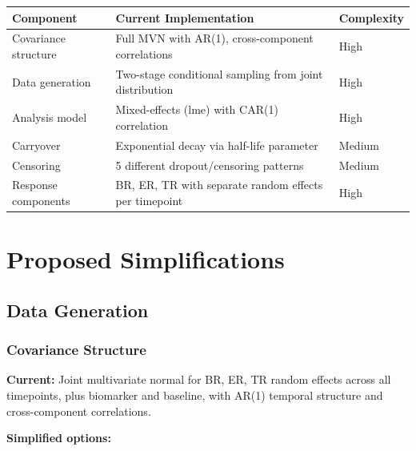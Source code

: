 \documentclass[11pt]{article}
\begin{document}
\begin{table}[h]
\centering
\begin{tabular}{@{}lll@{}}
\toprule
Component & Current Implementation & Complexity \\
\midrule
Covariance structure & Full MVN with AR(1), cross-component correlations & High \\
Data generation & Two-stage conditional sampling from joint distribution & High \\
Analysis model & Mixed-effects (lme) with CAR(1) correlation & High \\
Carryover & Exponential decay via half-life parameter & Medium \\
Censoring & 5 different dropout/censoring patterns & Medium \\
Response components & BR, ER, TR with separate random effects per timepoint & High \\
\bottomrule
\end{tabular}
\end{table}


\section{Proposed Simplifications}

\subsection{Data Generation}

\subsubsection{Covariance Structure}

\textbf{Current:} Joint multivariate normal for BR, ER, TR random
effects across all timepoints, plus biomarker and baseline, with AR(1)
temporal structure and cross-component correlations.

\textbf{Simplified options:}
\end{document}
